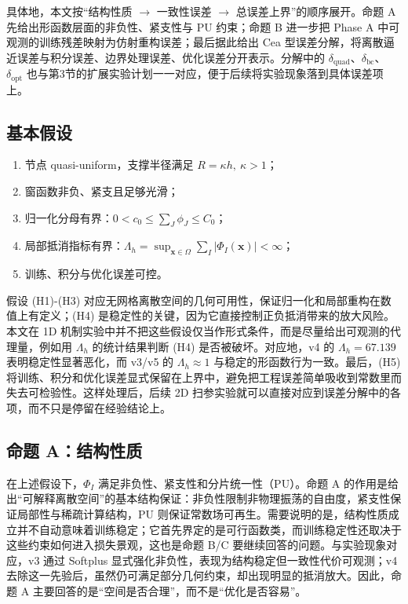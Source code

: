﻿\documentclass[lang=cn,a4paper]{elegantpaper}
\begin{document}
具体地，本文按“结构性质 $\rightarrow$ 一致性误差 $\rightarrow$ 总误差上界”的顺序展开。命题 A 先给出形函数层面的非负性、紧支性与 PU 约束；命题 B 进一步把 Phase A 中可观测的训练残差映射为仿射重构误差；最后据此给出 Cea 型误差分解，将离散逼近误差与积分误差、边界处理误差、优化误差分开表示。分解中的 $\delta_{\mathrm{quad}}$、$\delta_{\mathrm{bc}}$、$\delta_{\mathrm{opt}}$ 也与第3节的扩展实验计划一一对应，便于后续将实验现象落到具体误差项上。
\subsection{基本假设}
\begin{enumerate}[label=(H\arabic*)]
  \item 节点 quasi-uniform，支撑半径满足 $R=\kappa h,\ \kappa>1$；
  \item 窗函数非负、紧支且足够光滑；
  \item 归一化分母有界：$0<c_0\le\sum_J\phi_J\le C_0$；
  \item 局部抵消指标有界：$\Lambda_h=\sup_{\bm{x}\in\Omega}\sum_I|\Phi_I(\bm{x})|<\infty$；
  \item 训练、积分与优化误差可控。
\end{enumerate}
假设 (H1)-(H3) 对应无网格离散空间的几何可用性，保证归一化和局部重构在数值上有定义；(H4) 是稳定性的关键，因为它直接控制正负抵消带来的放大风险。本文在 1D 机制实验中并不把这些假设仅当作形式条件，而是尽量给出可观测的代理量，例如用 $\Lambda_h$ 的统计结果判断 (H4) 是否被破坏。对应地，v4 的 $\Lambda_h=67.139$ 表明稳定性显著恶化，而 v3/v5 的 $\Lambda_h\approx1$ 与稳定的形函数行为一致。最后，(H5) 将训练、积分和优化误差显式保留在上界中，避免把工程误差简单吸收到常数里而失去可检验性。这样处理后，后续 2D 扫参实验就可以直接对应到误差分解中的各项，而不只是停留在经验结论上。

\subsection{命题 A：结构性质}
在上述假设下，$\Phi_I$ 满足非负性、紧支性和分片统一性（PU）。命题 A 的作用是给出“可解释离散空间”的基本结构保证：非负性限制非物理振荡的自由度，紧支性保证局部性与稀疏计算结构，PU 则保证常数场可再生。需要说明的是，结构性质成立并不自动意味着训练稳定；它首先界定的是可行函数类，而训练稳定性还取决于这些约束如何进入损失景观，这也是命题 B/C 要继续回答的问题。与实验现象对应，v3 通过 Softplus 显式强化非负性，表现为结构稳定但一致性代价可观测；v4 去除这一先验后，虽然仍可满足部分几何约束，却出现明显的抵消放大。因此，命题 A 主要回答的是“空间是否合理”，而不是“优化是否容易”。
\end{document}
